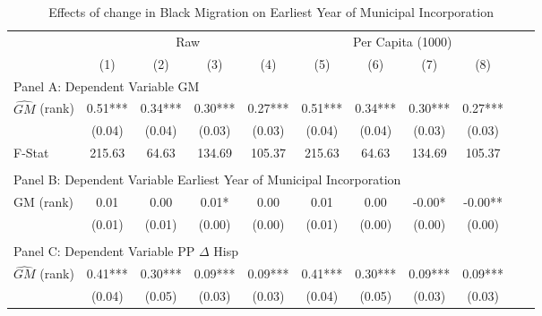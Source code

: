  \begin{table}[htbp]\centering {} \begin{threeparttable} \caption{Effects of change in Black Migration on Earliest Year of Municipal Incorporation} \begin{tabular}{l*{10}{c}} \toprule
                &\multicolumn{4}{c}{Raw}                                    &\multicolumn{4}{c}{Per Capita (1000)}                      \\\cmidrule(lr){2-5}\cmidrule(lr){6-9}
                &\multicolumn{1}{c}{(1)}   &\multicolumn{1}{c}{(2)}   &\multicolumn{1}{c}{(3)}   &\multicolumn{1}{c}{(4)}   &\multicolumn{1}{c}{(5)}   &\multicolumn{1}{c}{(6)}   &\multicolumn{1}{c}{(7)}   &\multicolumn{1}{c}{(8)}   \\
\cmidrule(lr){1-9}
\multicolumn{8}{l}{Panel A: Dependent Variable GM}\\
\cmidrule(lr){1-9}
$\hat{GM}$ (rank)&       0.51***&       0.34***&       0.30***&       0.27***&       0.51***&       0.34***&       0.30***&       0.27***\\
                &     (0.04)   &     (0.04)   &     (0.03)   &     (0.03)   &     (0.04)   &     (0.04)   &     (0.03)   &     (0.03)   \\
\midrule
F-Stat          &     215.63   &      64.63   &     134.69   &     105.37   &     215.63   &      64.63   &     134.69   &     105.37   \\
\cmidrule[\heavyrulewidth](lr){1-9} \\ \cmidrule[\heavyrulewidth](lr){1-9}
\multicolumn{8}{l}{Panel B: Dependent Variable Earliest Year of Municipal Incorporation}\\
\cmidrule(lr){1-9}
GM  (rank)      &       0.01   &       0.00   &       0.01*  &       0.00   &       0.01   &       0.00   &      -0.00*  &      -0.00** \\
                &     (0.01)   &     (0.01)   &     (0.00)   &     (0.00)   &     (0.01)   &     (0.00)   &     (0.00)   &     (0.00)   \\
\cmidrule[\heavyrulewidth](lr){1-9} \\ \cmidrule[\heavyrulewidth](lr){1-9}
\multicolumn{8}{l}{Panel C: Dependent Variable PP $\Delta$ Hisp}\\
\cmidrule(lr){1-9}
$\hat{GM}$ (rank)&       0.41***&       0.30***&       0.09***&       0.09***&       0.41***&       0.30***&       0.09***&       0.09***\\
                &     (0.04)   &     (0.05)   &     (0.03)   &     (0.03)   &     (0.04)   &     (0.05)   &     (0.03)   &     (0.03)   \\

\end{tabular}
\end{threeparttable}
\end{table}
